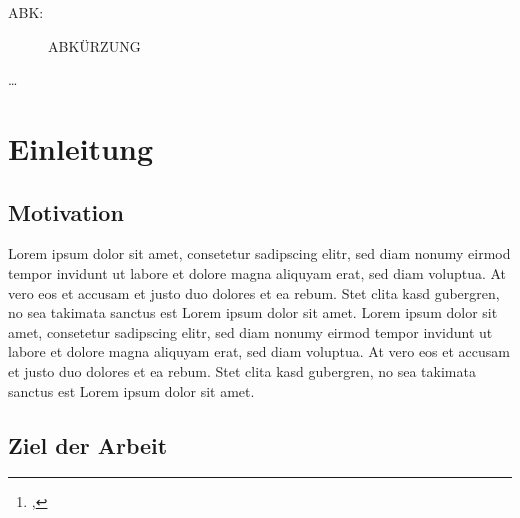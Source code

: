 \documentclass[12pt,toc=bib,toc=listof]{scrreprt}
\title{\reprttopic}
\author{\reprtstudentname\footnote{\reprtstudentid, \reprtstudentmail}}
\begin{document}
\maketitle
{}

\tableofcontents

\label{sec:listofabbrv}

\label{sec:abkuerzungsverzeichnis}

\begin{description}
  \item[ABK:] ABKÜRZUNG 
\end{description}


\onehalfspacing

\label{cha:management_summary}
\ldots

\newpage
{}

\chapter{Einleitung} %
\label{sec:einleitung}

\section{Motivation} %
\label{sec:motivation}

Lorem ipsum dolor sit amet, consetetur sadipscing elitr, sed diam nonumy eirmod
tempor invidunt ut labore et dolore magna aliquyam erat, sed diam voluptua. At
vero eos et accusam et justo duo dolores et ea rebum. Stet clita kasd
gubergren, no sea takimata sanctus est Lorem ipsum dolor sit amet. Lorem ipsum
dolor sit amet, consetetur sadipscing elitr, sed diam nonumy eirmod tempor
invidunt ut labore et dolore magna aliquyam erat, sed diam voluptua. At vero
eos et accusam et justo duo dolores et ea rebum. Stet clita kasd gubergren, no
sea takimata sanctus est Lorem ipsum dolor sit amet.


\section{Ziel der Arbeit} %
\label{sec:ziel_der_arbeit}
\end{document}

